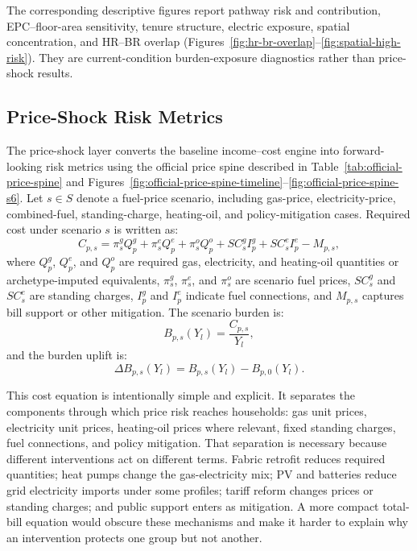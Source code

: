 The corresponding descriptive figures report pathway risk and contribution, EPC--floor-area sensitivity, tenure structure, electric exposure, spatial concentration, and HR--BR overlap (Figures~\ref{fig:hr-br-overlap}--\ref{fig:spatial-high-risk}). They are current-condition burden-exposure diagnostics rather than price-shock results.

\subsection{Price-Shock Risk Metrics}

The price-shock layer converts the baseline income--cost engine into forward-looking risk metrics using the official price spine described in Table~\ref{tab:official-price-spine} and Figures~\ref{fig:official-price-spine-timeline}--\ref{fig:official-price-spine-s6}. Let $s \in S$ denote a fuel-price scenario, including gas-price, electricity-price, combined-fuel, standing-charge, heating-oil, and policy-mitigation cases. Required cost under scenario $s$ is written as:
\begin{equation}
C_{p,s}=\pi^g_s Q^g_p+\pi^e_s Q^e_p+\pi^o_s Q^o_p+SC^g_s I^g_p+SC^e_s I^e_p-M_{p,s},
\end{equation}
where $Q^g_p$, $Q^e_p$, and $Q^o_p$ are required gas, electricity, and heating-oil quantities or archetype-imputed equivalents, $\pi^g_s$, $\pi^e_s$, and $\pi^o_s$ are scenario fuel prices, $SC^g_s$ and $SC^e_s$ are standing charges, $I^g_p$ and $I^e_p$ indicate fuel connections, and $M_{p,s}$ captures bill support or other mitigation. The scenario burden is:
\begin{equation}
B_{p,s}(Y_l)=\frac{C_{p,s}}{Y_l},
\end{equation}
and the burden uplift is:
\begin{equation}
\Delta B_{p,s}(Y_l)=B_{p,s}(Y_l)-B_{p,0}(Y_l).
\end{equation}

This cost equation is intentionally simple and explicit. It separates the components through which price risk reaches households: gas unit prices, electricity unit prices, heating-oil prices where relevant, fixed standing charges, fuel connections, and policy mitigation. That separation is necessary because different interventions act on different terms. Fabric retrofit reduces required quantities; heat pumps change the gas-electricity mix; PV and batteries reduce grid electricity imports under some profiles; tariff reform changes prices or standing charges; and public support enters as mitigation. A more compact total-bill equation would obscure these mechanisms and make it harder to explain why an intervention protects one group but not another.

